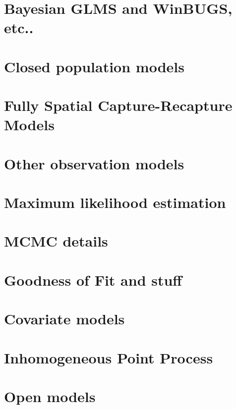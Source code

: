 \documentclass{book}
\begin{document}



\chapter{Bayesian GLMS and WinBUGS, etc..}
\label{chapt.glms}

\chapter{Closed population models}
\label{chapt.closed}


\chapter{Fully Spatial Capture-Recapture Models}
\label{chapt.scr0}


\chapter{Other observation models}
\label{chapt.poisson}


\chapter{Maximum likelihood estimation}
\label{chapt.mle}


\chapter{MCMC details}
\label{chapt.mcmc}


\chapter{Goodness of Fit and stuff}
\label{chapt.gof}



\chapter{Covariate models}
\label{chapt.covariates}


\chapter{Inhomogeneous Point Process}
\label{chapt.ipp}

\chapter{Open models}
\label{chapt.open}



\end{document}
